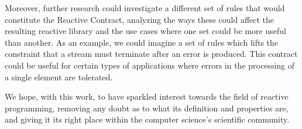 Moreover, further research could investigate a different set of rules that would constitute the Reactive Contract, analyzing the ways these could affect the resulting reactive library and the use cases where one set could be more useful than another. As an example, we could imagine a set of rules which lifts the constraint that a stream must terminate after an error is produced. This contract could be useful for certain types of applications where errors in the processing of a single element are tolerated.

We hope, with this work, to have sparkled interest towards the field of reactive programming, removing any doubt as to what its definition and properties are, and giving it its right place within the computer science's scientific community.
